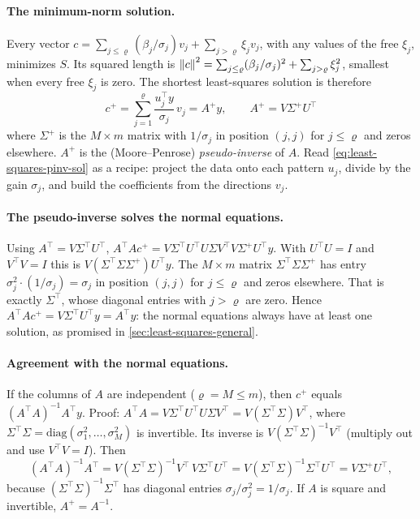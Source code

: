 \paragraph{The minimum-norm solution.} Every vector $c = \sum_{j\le\varrho}(\beta_j/\sigma_j)v_j + \sum_{j>\varrho}\xi_jv_j$, with any values of the free $\xi_j$, minimizes $S$. Its squared length is $\left\lVert c\right\rVert^2 = \sum_{j\le\varrho}(\beta_j/\sigma_j)^2 + \sum_{j>\varrho}\xi_j^2$, smallest when every free $\xi_j$ is zero. The shortest least-squares solution is therefore
\begin{equation}
\boxed{\,c^{+} = \sum_{j=1}^{\varrho} \frac{u_j^\top y}{\sigma_j}\, v_j = A^{+}y,\qquad A^{+} = V\Sigma^{+}U^\top\,}
\label{eq:least-squares-pinv-sol}
\end{equation}
where $\Sigma^+$ is the $M\times m$ matrix with $1/\sigma_j$ in position $(j,j)$ for $j\le\varrho$ and zeros elsewhere. $A^+$ is the (Moore--Penrose) \emph{pseudo-inverse} of $A$. Read \cref{eq:least-squares-pinv-sol} as a recipe: project the data onto each pattern $u_j$, divide by the gain $\sigma_j$, and build the coefficients from the directions $v_j$.

\paragraph{The pseudo-inverse solves the normal equations.} Using $A^\top = V\Sigma^\top U^\top$, $A^\top Ac^+ = V\Sigma^\top U^\top U\Sigma V^\top V\Sigma^+U^\top y$. With $U^\top U = I$ and $V^\top V = I$ this is $V(\Sigma^\top\Sigma\Sigma^+)U^\top y$. The $M\times m$ matrix $\Sigma^\top\Sigma\Sigma^+$ has entry $\sigma_j^2\cdot(1/\sigma_j) = \sigma_j$ in position $(j,j)$ for $j\le\varrho$ and zeros elsewhere. That is exactly $\Sigma^\top$, whose diagonal entries with $j>\varrho$ are zero. Hence $A^\top Ac^+ = V\Sigma^\top U^\top y = A^\top y$: the normal equations always have at least one solution, as promised in \cref{sec:least-squares-general}.

\paragraph{Agreement with the normal equations.} If the columns of $A$ are independent ($\varrho = M\le m$), then $c^+$ equals $(A^\top A)^{-1}A^\top y$. Proof: $A^\top A = V\Sigma^\top U^\top U\Sigma V^\top = V(\Sigma^\top\Sigma)V^\top$, where $\Sigma^\top\Sigma = \mathrm{diag}(\sigma_1^2,\dots,\sigma_M^2)$ is invertible. Its inverse is $V(\Sigma^\top\Sigma)^{-1}V^\top$ (multiply out and use $V^\top V = I$). Then
\[
(A^\top A)^{-1}A^\top = V(\Sigma^\top\Sigma)^{-1}V^\top\,V\Sigma^\top U^\top = V(\Sigma^\top\Sigma)^{-1}\Sigma^\top U^\top = V\Sigma^+U^\top ,
\]
because $(\Sigma^\top\Sigma)^{-1}\Sigma^\top$ has diagonal entries $\sigma_j/\sigma_j^2 = 1/\sigma_j$. If $A$ is square and invertible, $A^+ = A^{-1}$.

